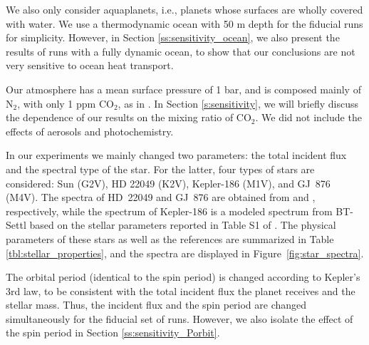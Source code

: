 \documentclass[11pt,numberedappendix,twocolappendix,]{emulateapj}
\begin{document}
We also only consider aquaplanets, i.e., planets whose surfaces are wholly covered with water. 
We use a thermodynamic ocean with 50 m depth for the fiducial runs for simplicity. 
However, in Section \ref{ss:sensitivity_ocean}, we also present the results of runs with a fully dynamic ocean, to show that our conclusions are not very sensitive to ocean heat transport. 

Our atmosphere has a mean surface pressure of 1 bar, and is composed mainly of N$_2$, with only 1 ppm CO$_2$, as in \citet{Kopparapu2016}. 
In Section \ref{s:sensitivity}, we will briefly discuss the dependence of our results on the mixing ratio of CO$_2$. 
We did not include the effects of aerosols and photochemistry. 


In our experiments we mainly changed two parameters: the total incident flux and the spectral type of the star. 
For the latter, four types of stars are considered: 
Sun (G2V), 
HD 22049 (K2V), 
Kepler-186 (M1V), and 
GJ~876 (M4V). 
The spectra of HD~22049 and GJ~876 are obtained from \citet{Segura2003} and \citet{Domagal-Goldman2014}, respectively, 
while the spectrum of Kepler-186 is a modeled spectrum from BT-Settl \citep{Allard2012} based on the stellar parameters reported in Table S1 of \citet{Quintana2014}. 
The physical parameters of these stars as well as the references are summarized in Table \ref{tbl:stellar_properties}, and the spectra are displayed in Figure~\ref{fig:star_spectra}. 

The orbital period (identical to the spin period) is changed according to Kepler's 3rd law, to be consistent with the total incident flux the planet receives and the stellar mass. Thus, the incident flux and the spin period are changed simultaneously for the fiducial set of runs. 
However, we also isolate the effect of the spin period in Section \ref{ss:sensitivity_Porbit}. 
\end{document}
